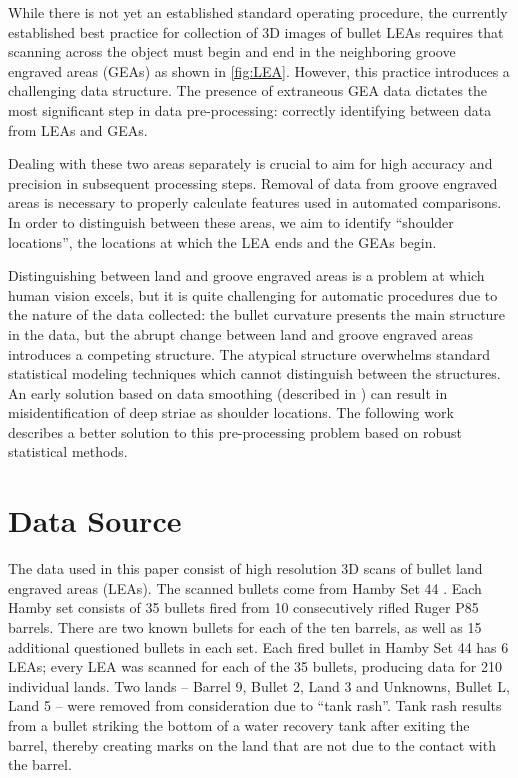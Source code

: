 \documentclass[]{article}
\begin{document}
While there is not yet an established standard operating procedure, the
currently established best practice for collection of 3D images of
bullet LEAs requires that scanning across the object must begin and end
in the neighboring groove engraved areas (GEAs) as shown in
\autoref{fig:LEA}. However, this practice introduces a challenging data
structure. The presence of extraneous GEA data dictates the most
significant step in data pre-processing: correctly identifying between
data from LEAs and GEAs.

Dealing with these two areas separately is crucial to aim for high
accuracy and precision in subsequent processing steps. Removal of data
from groove engraved areas is necessary to properly calculate features
used in automated comparisons. In order to distinguish between these
areas, we aim to identify ``shoulder locations'', the locations at which
the LEA ends and the GEAs begin.

Distinguishing between land and groove engraved areas is a problem at
which human vision excels, but it is quite challenging for automatic
procedures due to the nature of the data collected: the bullet curvature
presents the main structure in the data, but the abrupt change between
land and groove engraved areas introduces a competing structure. The
atypical structure overwhelms standard statistical modeling techniques
which cannot distinguish between the structures. An early solution based
on data smoothing (described in \citep{Hare1}) can result in
misidentification of deep striae as shoulder locations. The following
work describes a better solution to this pre-processing problem based on
robust statistical methods.

\section{Data Source}

The data used in this paper consist of high resolution 3D scans of
bullet land engraved areas (LEAs). The scanned bullets come from Hamby
Set 44 \citep{Hamby}. Each Hamby set consists of 35 bullets fired from
10 consecutively rifled Ruger P85 barrels. There are two known bullets
for each of the ten barrels, as well as 15 additional questioned bullets
in each set. Each fired bullet in Hamby Set 44 has 6 LEAs; every LEA was
scanned for each of the 35 bullets, producing data for 210 individual
lands. Two lands -- Barrel 9, Bullet 2, Land 3 and Unknowns, Bullet L,
Land 5 -- were removed from consideration due to ``tank rash''. Tank
rash results from a bullet striking the bottom of a water recovery tank
after exiting the barrel, thereby creating marks on the land that are
not due to the contact with the barrel.
\end{document}
